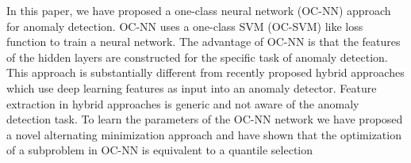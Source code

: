 In this paper, we have proposed a one-class neural network (OC-NN) approach for anomaly detection.
OC-NN uses a one-class SVM (OC-SVM) like loss function to train a neural network.
The advantage of OC-NN is that the features of the hidden layers are constructed for the specific
task of anomaly detection. This approach is substantially different from recently proposed
hybrid approaches which use deep learning features as input into an anomaly detector.  Feature
extraction in hybrid approaches is generic and not aware of the anomaly detection task. To learn
the parameters of the OC-NN network we have proposed a novel alternating minimization approach and
have shown that the optimization of a subproblem in OC-NN is equivalent to a quantile selection


